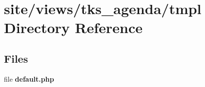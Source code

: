 \section{site/views/tks\+\_\+agenda/tmpl Directory Reference}
\label{dir_f6474065fa86af982530815a42af2f6a}
\subsection*{Files}
\begin{DoxyCompactItemize}
\item 
file \textbf{ default.\+php}
\end{DoxyCompactItemize}
